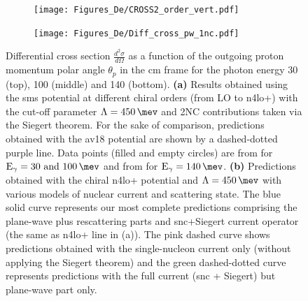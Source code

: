     \begin{figure}[h]
        \centering
        \begin{subfigure}[t]{0.46\textwidth}
            \caption{}
            \texttt{[image: Figures\_De/CROSS2\_order\_vert.pdf]}
            \label{Diff_cross_order}
        \end{subfigure}
        \begin{subfigure}[t]{0.46\textwidth}
            \caption{}
            \texttt{[image: Figures\_De/Diff\_cross\_pw\_1nc.pdf]}
            \label{Diff_cross_pw_1nc}
        \end{subfigure}
        \caption{Differential cross section $\frac{d^2\sigma}{d\Omega}$
        as a function of the outgoing proton momentum polar angle $\theta_p$ in the \gls{cm} frame 
        for the photon energy \SI{30}{\mev} (top), \SI{100}{\mev} (middle) and \SI{140}{\mev} (bottom).
        {\bf (a)} Results obtained using the \gls{sms} potential
        at different chiral orders (from LO to \gls{n4lo+}) with the cut-off parameter $\Lambda=\SI{450}{\mev}$ and 
        2NC contributions taken via the Siegert theorem.
        For the sake of comparison, predictions obtained with the \gls*{av18} potential are shown
        by a dashed-dotted purple line.
        Data points (filled and empty circles) are from \cite{Ying_Experiment_Deut}
        for $\text{E}_\gamma=\SIlist[list-units = single]{30; 100}{\mev}$
        and from \cite{DeSanctis_Experiment_Deut} for $\text{E}_\gamma=\SI{140}{\mev}$.
        {\bf (b)} Predictions obtained with the chiral \gls{n4lo+} potential and $\Lambda=\SI{450}{\mev}$
        with various models of nuclear current and scattering state.
        The blue solid curve represents our most complete predictions
        comprising the plane-wave plus rescattering parts and \gls{snc}+Siegert current operator 
        (the same as \gls{n4lo+} line in (a)).
        The pink dashed curve shows predictions obtained with
        the single-nucleon current only (without applying the Siegert theorem) and the green dashed-dotted
        curve represents predictions with the full current (\gls{snc} + Siegert) but plane-wave part only.
        }
        \label{Diff_cross_order_pw}
    \end{figure}


